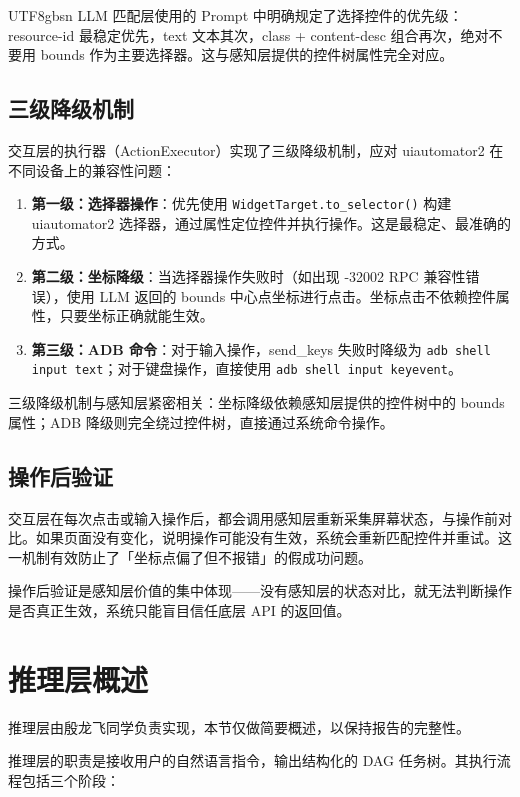 \documentclass{article}
\begin{document}
\begin{CJK}{UTF8}{gbsn}
LLM 匹配层使用的 Prompt 中明确规定了选择控件的优先级：resource-id 最稳定优先，text 文本其次，class + content-desc 组合再次，绝对不要用 bounds 作为主要选择器。这与感知层提供的控件树属性完全对应。

\subsection{三级降级机制}

交互层的执行器（ActionExecutor）实现了三级降级机制，应对 uiautomator2 在不同设备上的兼容性问题：

\begin{enumerate}[leftmargin=1.5em]
  \item \textbf{第一级：选择器操作}：优先使用 \texttt{WidgetTarget.to\_selector()} 构建 uiautomator2 选择器，通过属性定位控件并执行操作。这是最稳定、最准确的方式。
  \item \textbf{第二级：坐标降级}：当选择器操作失败时（如出现 -32002 RPC 兼容性错误），使用 LLM 返回的 bounds 中心点坐标进行点击。坐标点击不依赖控件属性，只要坐标正确就能生效。
  \item \textbf{第三级：ADB 命令}：对于输入操作，send\_keys 失败时降级为 \texttt{adb shell input text}；对于键盘操作，直接使用 \texttt{adb shell input keyevent}。
\end{enumerate}

三级降级机制与感知层紧密相关：坐标降级依赖感知层提供的控件树中的 bounds 属性；ADB 降级则完全绕过控件树，直接通过系统命令操作。

\subsection{操作后验证}

交互层在每次点击或输入操作后，都会调用感知层重新采集屏幕状态，与操作前对比。如果页面没有变化，说明操作可能没有生效，系统会重新匹配控件并重试。这一机制有效防止了「坐标点偏了但不报错」的假成功问题。

操作后验证是感知层价值的集中体现——没有感知层的状态对比，就无法判断操作是否真正生效，系统只能盲目信任底层 API 的返回值。

\section{推理层概述}
\label{sec:reasoner_layer}

推理层由殷龙飞同学负责实现，本节仅做简要概述，以保持报告的完整性。

推理层的职责是接收用户的自然语言指令，输出结构化的 DAG 任务树。其执行流程包括三个阶段：


\end{CJK}
\end{document}
